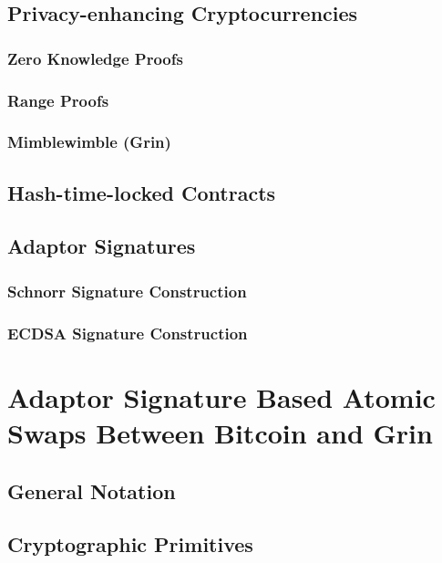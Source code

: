 \documentclass[draft,final]{vutinfth} %
\begin{document}
\section{Privacy-enhancing Cryptocurrencies}
\subsection{Zero Knowledge Proofs}
\subsection{Range Proofs}
\subsection{Mimblewimble (Grin)}
\section{Hash-time-locked Contracts}
\section{Adaptor Signatures}
\subsection{Schnorr Signature Construction}
\subsection{ECDSA Signature Construction}

\chapter{Adaptor Signature Based Atomic Swaps Between Bitcoin and Grin}
\section{General Notation}
\section{Cryptographic Primitives}
\end{document}
